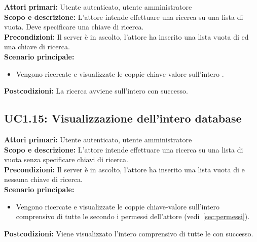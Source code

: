 \documentclass{scalatekids-article}
\begin{document}
\textbf{Attori primari:} Utente autenticato, utente amministratore\\
\textbf{Scopo e descrizione:} L'attore intende effettuare una ricerca su una lista di  vuota. Deve specificare una chiave di ricerca.\\
\textbf{Precondizioni:} Il server è in ascolto, l'attore ha inserito una lista vuota di  ed una chiave di ricerca.\\
\textbf{Scenario principale:}
\begin{itemize}
\item Vengono ricercate e visualizzate le coppie chiave-valore sull'intero .
\end{itemize}
\textbf{Postcodizioni:} La ricerca avviene sull'intero  con successo.

\subsection{UC1.15: Visualizzazione dell'intero database}

\textbf{Attori primari:} Utente autenticato, utente amministratore\\
\textbf{Scopo e descrizione:} L'attore intende effettuare una ricerca su una lista di  vuota senza specificare chiavi di ricerca.\\
\textbf{Precondizioni:} Il server è in ascolto, l'attore ha inserito una lista vuota di  e nessuna chiave di ricerca.\\
\textbf{Scenario principale:}
\begin{itemize}
\item Vengono ricercate e visualizzate le coppie chiave-valore sull'intero  comprensivo di tutte le  secondo i permessi dell'attore (vedi~\ref{sec:permessi}).
\end{itemize}
\textbf{Postcodizioni:} Viene visualizzato l'intero  comprensivo di tutte le  con successo.

\end{document}

